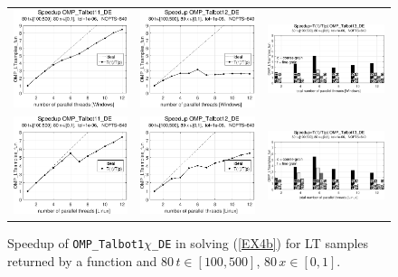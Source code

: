 \documentclass[a4paper,10pt]{report}%
\begin{document}
\begin{figure}[htb]
\centering
\begin{tabular}{ccc} %
\includegraphics[height=0.2\textwidth]{./FIGS/EX4b/EX4b_fun_speedup_11_80t_100_Windows.eps} &
\includegraphics[height=0.2\textwidth]{./FIGS/EX4b/EX4b_fun_speedup_12_80t_100_Windows.eps} &
\includegraphics[height=0.2\textwidth,keepaspectratio=true]{./FIGS/EX4b/EX4b_fun_speedup_13_80t_100_Windows.eps} \\
\includegraphics[height=0.2\textwidth]{./FIGS/EX4b/EX4b_fun_speedup_11_80t_100_Linux.eps} &
\includegraphics[height=0.2\textwidth]{./FIGS/EX4b/EX4b_fun_speedup_12_80t_100_Linux.eps} &
\includegraphics[height=0.2\textwidth,keepaspectratio=true]{./FIGS/EX4b/EX4b_fun_speedup_13_80t_100_Linux.eps}
\end{tabular}
\caption{\small Speedup of {\tt OMP\_Talbot1$\chi$\_DE} in solving (\ref{EX4b}) for LT samples
returned by a function and $80\,t\in[100,500]$, $80\,x\in[0,1]$.}
\label{PAR_EX4b_speedup_fun3}
\end{figure}
\end{document}
